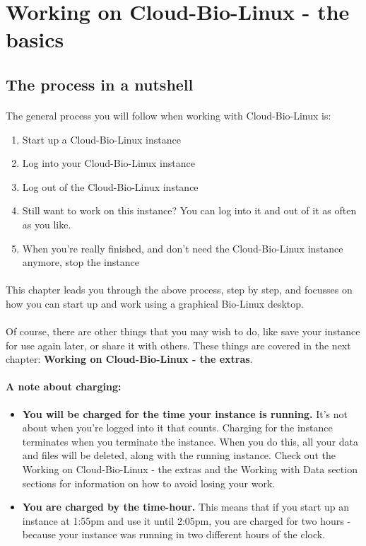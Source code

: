 \section{Working on Cloud-Bio-Linux - the basics}

\subsection{The process in a nutshell}
\paragraph{}The general process you will follow when working with Cloud-Bio-Linux is:
\begin{enumerate}
\item Start up a Cloud-Bio-Linux instance
\item Log into your Cloud-Bio-Linux instance
\item Log out of the  Cloud-Bio-Linux instance
\item Still want to work on this instance? You can log into it and out of it as often as you like. 
\item When you're really finished, and don't need the Cloud-Bio-Linux instance anymore, stop the instance
\end{enumerate}

\paragraph{}This chapter leads you through the above process, step by step, and focusses on how you can start up and work using a graphical Bio-Linux desktop.

\paragraph{}Of course, there are other things that you may wish to do, like save your instance for use again later, or share it with others. These things are covered in the next chapter: \textbf{Working on Cloud-Bio-Linux - the extras}.

\paragraph{A note about charging:} 
\begin{itemize}
\item \textbf{You will be charged for the time your instance is running.} It's not about when you're logged into it that counts. Charging for the instance terminates when you terminate the instance. When you do this, all your data and files will be deleted, along with the running instance. Check out the Working on Cloud-Bio-Linux - the extras and the Working with Data section sections for information on how to avoid losing your work. 
\item \textbf{You are charged by the time-hour.} This means that if you start up an instance at 1:55pm and use it until 2:05pm, you are charged for two hours - because your instance was running in two different hours of the clock. 

\end{itemize}

